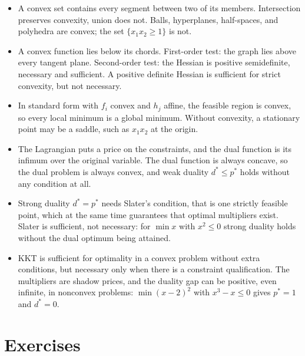 \begin{ringkasan}
\begin{itemize}
  \item A convex set contains every segment between two of its members. Intersection preserves
        convexity, union does not. Balls, hyperplanes, half-spaces, and polyhedra are convex;
        the set $\{x_{1}x_{2}\ge1\}$ is not.
  \item A convex function lies below its chords. First-order test: the graph lies above every
        tangent plane. Second-order test: the Hessian is positive semidefinite, necessary and
        sufficient. A positive definite Hessian is sufficient for strict convexity, but not
        necessary.
  \item In standard form with $f_{i}$ convex and $h_{j}$ affine, the feasible region is convex,
        so every local minimum is a global minimum. Without convexity, a stationary point may be
        a saddle, such as $x_{1}x_{2}$ at the origin.
  \item The Lagrangian puts a price on the constraints, and the dual function is its infimum over
        the original variable. The dual function is always concave, so the dual problem is always
        convex, and weak duality $d^{*}\le p^{*}$ holds without any condition at all.
  \item Strong duality $d^{*}=p^{*}$ needs Slater's condition, that is one strictly feasible
        point, which at the same time guarantees that optimal multipliers exist. Slater is
        sufficient, not necessary: for $\min x$
        with $x^{2}\le0$ strong duality holds without the dual optimum being attained.
  \item KKT is sufficient for optimality in a convex problem without extra conditions, but
        necessary only when there is a constraint qualification. The multipliers are shadow
        prices, and the duality gap can be positive, even infinite, in nonconvex problems:
        $\min (x-2)^{2}$
        with $x^{3}-x\le0$ gives $p^{*}=1$ and $d^{*}=0$.
\end{itemize}
\end{ringkasan}

\section{Exercises}

